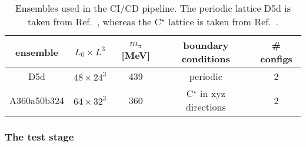\begin{table}[t]
  \centering
  \begin{tabular}{ccccc}
    \toprule
    {ensemble}&
    {$L_0 \times L^3$}&
    {$m_{\pi}$ [MeV]}&
    {boundary conditions}&
    {\# configs} \\
    \midrule
    D5d         & $48 \times 24^3$ & 439 & periodic    & 2 \\
    A360a50b324 & $64 \times 32^3$ & 360 & C$^{\star}$ in xyz directions & 2 \\
    \bottomrule
  \end{tabular}
  \caption{\label{tab:cicd:ensembles}%
    Ensembles used in the CI/CD pipeline. The periodic lattice D5d is taken from Ref.~\cite{online:cls}, whereas the C$^{\star}$ lattice is taken from Ref.~\cite{RCstar22}.}
\end{table}

\subsubsection{The test stage}
\label{sec:cicd:pipeline:gitlab:test}

